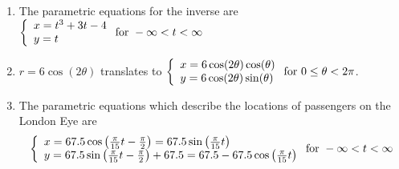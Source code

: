 \documentclass{ximera}
\begin{document}
\begin{enumerate} 
\setcounter{enumi}{\value{HW}}

\item  The parametric equations for the inverse are ${\displaystyle \left\{ \begin{array}{l} x = t^3+3t-4 \\ y = t  \end{array} \right. \vspace{.25in} \mbox{for } -\infty < t < \infty}$

\item  $r = 6\cos(2\theta)$ translates to  ${\displaystyle \left\{ \begin{array}{l} x = 6\cos(2\theta)\cos(\theta) \\ y = 6\cos(2\theta)\sin(\theta)  \end{array} \right. \vspace{.25in} \mbox{for } 0 \leq \theta <  2\pi}$.

\item The parametric equations which describe the locations of passengers on the London Eye are \[ \left\{ \begin{array}{l} x = 67.5 \cos\left(\frac{\pi}{15} t - \frac{\pi}{2} \right) = 67.5 \sin\left(\frac{\pi}{15} t \right) \\ y = 67.5 \sin\left(\frac{\pi}{15} t - \frac{\pi}{2} \right) + 67.5 = 67.5 - 67.5 \cos\left(\frac{\pi}{15} t \right)   \end{array} \right. \vspace{.25in} \mbox{for } -\infty < t < \infty \]


\setcounter{HW}{\value{enumi}}
\end{enumerate}
\end{document}
